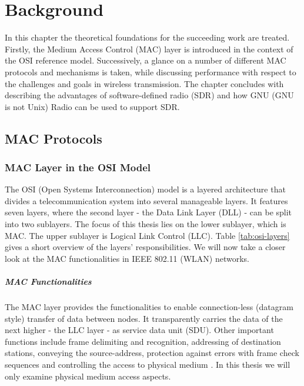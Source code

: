 \chapter{Background}
\label{ch:background}

In this chapter the theoretical foundations for the succeeding work are treated. Firstly, the Medium Access Control (MAC) layer is introduced in the context of the OSI reference model. Successively, a glance on a number of different MAC protocols and mechanisms is taken, while discussing performance with respect to the challenges and goals in wireless transmission. The chapter concludes with describing the advantages of software-defined radio (SDR) and how GNU (GNU is not Unix) Radio can be used to support SDR.

\section{MAC Protocols}

\subsection{MAC Layer in the OSI Model}

The OSI (Open Systems Interconnection) model is a layered architecture that divides a telecommunication system into several manageable layers. It features seven layers, where the second layer - the Data Link Layer (DLL) - can be split into two sublayers. The focus of this thesis lies on the lower sublayer, which is MAC. The upper sublayer is Logical Link Control (LLC). Table \ref{tab:osi-layers} gives a short overview of the layers' responsibilities. We will now take a closer look at the MAC functionalities in IEEE 802.11 (WLAN) networks. 

\paragraph{MAC Functionalities} The MAC layer provides the functionalities to enable connection-less (datagram style) transfer of data between nodes. It transparently carries the data of the next higher - the LLC layer - as service data unit (SDU). Other important functions include frame delimiting and recognition, addressing of destination stations, conveying the source-address, protection against errors with frame check sequences and controlling the access to physical medium \cite{802-std}. In this thesis we will only examine physical medium access aspects. 

